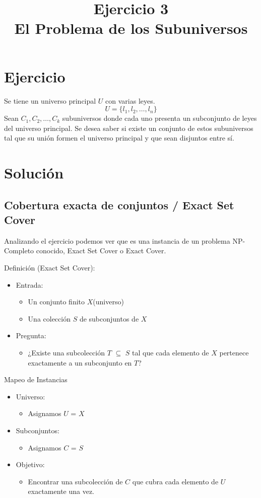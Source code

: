 \documentclass{article}
\title{Ejercicio 3 \\ El Problema de los Subuniversos}
\date{}
\begin{document}
\maketitle
\large
\section{Ejercicio}

Se tiene un universo principal \(U\) con varias leyes.
\[U = \{ l_1, l_2, \dots, l_n \}\]
Sean \(C_1, C_2, \dots, C_k\) subuniversos donde cada uno presenta un subconjunto de leyes del universo principal. Se desea saber si existe un conjunto de estos subuniversos tal que su unión formen el universo principal y que sean disjuntos entre sí.


\section{Solución}

\subsection{Cobertura exacta de conjuntos / Exact Set Cover}

Analizando el ejercicio podemos ver que es una instancia de un problema NP-Completo conocido, Exact Set Cover o Exact Cover.

Definición (Exact Set Cover):

\begin{itemize}
\item Entrada:
    \begin{itemize}
    \item Un conjunto finito \(X\)(universo)
    \item Una colección \(S\) de subconjuntos de \(X\)
    \end{itemize}
\item Pregunta:
    \begin{itemize}
    \item ¿Existe una subcolección \(T\) $\subseteq$ \(S\)  tal que cada elemento de \(X\) pertenece exactamente a un subconjunto en \(T\)?
    \end{itemize}
\end{itemize}

Mapeo de Instancias
\begin{itemize}
\item Universo:
    \begin{itemize}
    \item Asignamos \(U\) = \(X\)
    \end{itemize}
\item Subconjuntos:
    \begin{itemize}
    \item Asignamos \(C\) = \(S\)
    \end{itemize}
\item Objetivo:
    \begin{itemize}
    \item Encontrar una subcolección de \(C\) que cubra cada elemento de \(U\) exactamente una vez.
    \end{itemize}
\end{itemize}
\end{document}
